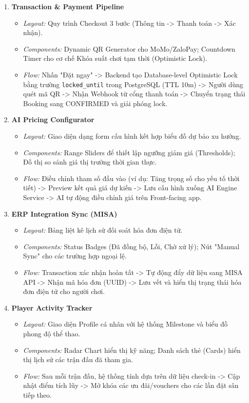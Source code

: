 \begin{enumerate}
    \item \textbf{Transaction \& Payment Pipeline}
    \begin{itemize}
        \item \textit{Layout:} Quy trình Checkout 3 bước (Thông tin -> Thanh toán -> Xác nhận).
        \item \textit{Components:} Dynamic QR Generator cho MoMo/ZaloPay; Countdown Timer cho cơ chế Khóa suất chơi tạm thời (Optimistic Lock).
        \item \textit{Flow:} Nhấn "Đặt ngay" -> Backend tạo Database-level Optimistic Lock bằng trường \texttt{locked\_until} trong PostgreSQL (TTL 10m) -> Người dùng quét mã QR -> Nhận Webhook từ cổng thanh toán -> Chuyển trạng thái Booking sang CONFIRMED và giải phóng lock.
    \end{itemize}

    \item \textbf{AI Pricing Configurator}
    \begin{itemize}
        \item \textit{Layout:} Giao diện dạng form cấu hình kết hợp biểu đồ dự báo xu hướng.
        \item \textit{Components:} Range Sliders để thiết lập ngưỡng giảm giá (Thresholds); Đồ thị so sánh giá thị trường thời gian thực.
        \item \textit{Flow:} Điều chỉnh tham số đầu vào (ví dụ: Tăng trọng số cho yếu tố thời tiết) -> Preview kết quả giá dự kiến -> Lưu cấu hình xuống AI Engine Service -> AI tự động điều chỉnh giá trên Front-facing app.
    \end{itemize}

    \item \textbf{ERP Integration Sync (MISA)}
    \begin{itemize}
        \item \textit{Layout:} Bảng liệt kê lịch sử đối soát hóa đơn điện tử.
        \item \textit{Components:} Status Badges (Đã đồng bộ, Lỗi, Chờ xử lý); Nút "Manual Sync" cho các trường hợp ngoại lệ.
        \item \textit{Flow:} Transaction xác nhận hoàn tất -> Tự động đẩy dữ liệu sang MISA API -> Nhận mã hóa đơn (UUID) -> Lưu vết và hiển thị trạng thái hóa đơn điện tử cho người chơi.
    \end{itemize}

    \item \textbf{Player Activity Tracker}
    \begin{itemize}
        \item \textit{Layout:} Giao diện Profile cá nhân với hệ thống Milestone và biểu đồ phong độ thể thao.
        \item \textit{Components:} Radar Chart hiển thị kỹ năng; Danh sách thẻ (Cards) hiển thị lịch sử các trận đấu đã tham gia.
        \item \textit{Flow:} Sau mỗi trận đấu, hệ thống tính dựa trên dữ liệu check-in -> Cập nhật điểm tích lũy -> Mở khóa các ưu đãi/vouchers cho các lần đặt sân tiếp theo.
    \end{itemize}


\end{enumerate}
